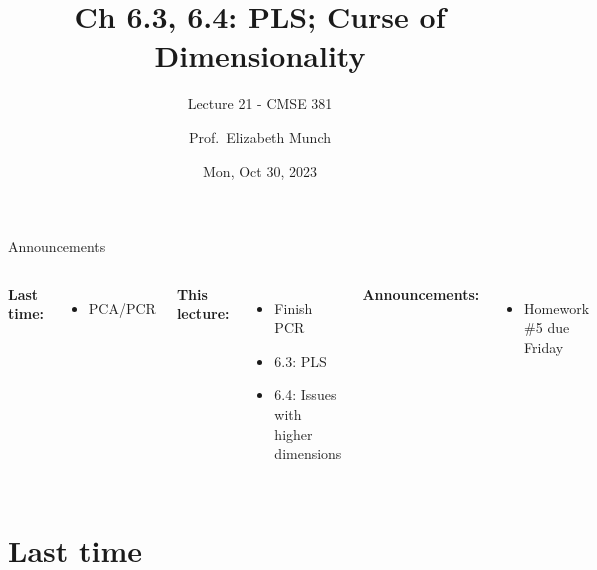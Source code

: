\documentclass[aspectratio=169,usenames,dvipsnames]{beamer}
\begin{document}
\title[]{Ch 6.3, 6.4: PLS; Curse of Dimensionality}
\subtitle{Lecture 21 - CMSE 381}
\date{Mon, Oct 30, 2023}



\author[Dr.~Munch]{Prof.~Elizabeth Munch}

\begin{frame}
 \titlepage


\end{frame}
\begin{frame}[c]{Announcements}

\begin{columns}
\centering

	\textbf{Last time:}
	\begin{itemize}
		\item PCA/PCR
	\end{itemize}

	\vspace{.2in}

	\textbf{This lecture:}
	\begin{itemize}
	\item Finish PCR
	\item 6.3: PLS
	\item 6.4: Issues with higher dimensions
\end{itemize}


\centering

\textbf{Announcements:}
	\begin{itemize}
		\item Homework \#5 due Friday 

	\end{itemize}
\end{columns}

\end{frame}



\section{Last time}
\end{document}
